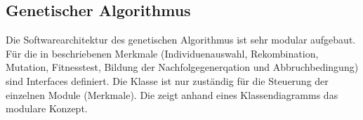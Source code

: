 \subsection{Genetischer Algorithmus}
\label{sec:ArchtikturGenetischerAlgorithmus}
Die Softwarearchitektur des genetischen Algorithmus ist sehr modular aufgebaut. Für die in  beschriebenen Merkmale (Individuenauswahl, Rekombination, Mutation, Fitnesstest, Bildung der Nachfolgegenerqation und Abbruchbedingung) sind Interfaces definiert. Die Klasse  ist nur zuständig für die Steuerung der einzelnen Module (Merkmale). Die  zeigt anhand eines Klassendiagramms das modulare Konzept.
